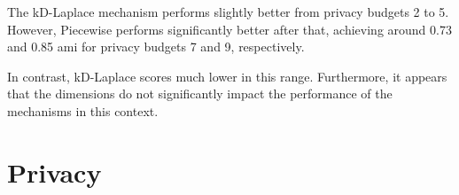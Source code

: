 The kD-Laplace mechanism performs slightly better from privacy budgets 2 to 5. However, Piecewise performs significantly better after that, achieving around 0.73 and 0.85 \gls{ami} for privacy budgets 7 and 9, respectively.

In contrast, kD-Laplace scores much lower in this range. Furthermore, it appears that the dimensions do not significantly impact the performance of the mechanisms in this context.
\newpage
\section{Privacy}
